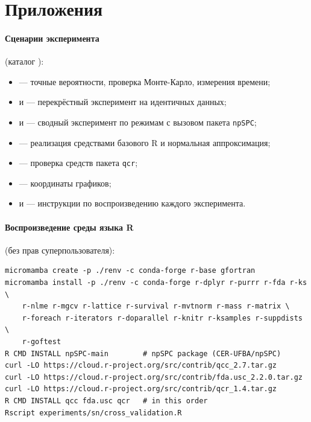 \documentclass[11pt,a4paper]{article}
\begin{document}
\section{Приложения}

\paragraph{Сценарии эксперимента} (каталог ):
\begin{itemize}[itemsep=1pt]
  \item {} --- точные вероятности, проверка Монте-Карло,
        измерения времени;
  \item {} и  --- перекрёстный
        эксперимент на идентичных данных;
  \item {} и  --- сводный
        эксперимент по режимам с вызовом пакета \texttt{npSPC};
  \item {} --- реализация средствами базового R и
        нормальная аппроксимация;
  \item {} --- проверка средств пакета \texttt{qcr};
  \item {} --- координаты графиков;
  \item {} и  --- инструкции по
        воспроизведению каждого эксперимента.
\end{itemize}

\paragraph{Воспроизведение среды языка R} (без прав суперпользователя):
\begin{lstlisting}
micromamba create -p ./renv -c conda-forge r-base gfortran
micromamba install -p ./renv -c conda-forge r-dplyr r-purrr r-fda r-ks \
    r-nlme r-mgcv r-lattice r-survival r-mvtnorm r-mass r-matrix \
    r-foreach r-iterators r-doparallel r-knitr r-ksamples r-suppdists \
    r-goftest
R CMD INSTALL npSPC-main        # npSPC package (CER-UFBA/npSPC)
curl -LO https://cloud.r-project.org/src/contrib/qcc_2.7.tar.gz
curl -LO https://cloud.r-project.org/src/contrib/fda.usc_2.2.0.tar.gz
curl -LO https://cloud.r-project.org/src/contrib/qcr_1.4.tar.gz
R CMD INSTALL qcc fda.usc qcr   # in this order
Rscript experiments/sn/cross_validation.R
\end{lstlisting}
\end{document}
